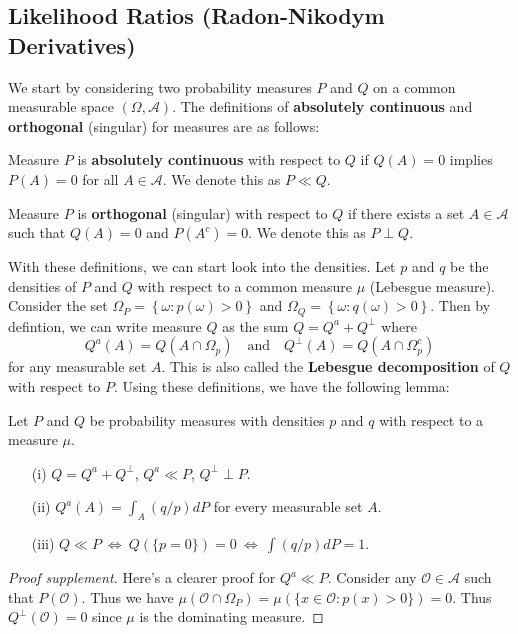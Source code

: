 \documentclass{article}
\begin{document}
\subsection{Likelihood Ratios (Radon-Nikodym Derivatives)}
We start by considering two probability measures $P$ and $Q$ on a common measurable space $(\Omega, \mathcal{A})$. The definitions of \textbf{absolutely continuous} and \textbf{orthogonal} (singular) for measures are as follows:
\begin{definition}
    Measure $P$ is \textbf{absolutely continuous} with respect to $Q$ if $Q(A) = 0$ implies $P(A) = 0$ for all $A \in \mathcal{A}$. We denote this as $P \ll Q$.
\end{definition}
\begin{definition}
    Measure $P$ is \textbf{orthogonal} (singular) with respect to $Q$ if there exists a set $A \in \mathcal{A}$ such that $Q(A) = 0$ and $P(A^c) = 0$. We denote this as $P \perp Q$.
\end{definition}
With these definitions, we can start look into the densities. Let $p$ and $q$ be the densities of $P$ and $Q$ with respect to a common measure $\mu$ (Lebesgue measure). Consider the set $\Omega_P = \left\{ \omega : p(\omega) > 0 \right\}$ and $\Omega_Q = \left\{ \omega : q(\omega) > 0 \right\}$. Then by defintion, we can write measure $Q$ as the sum $Q = Q^a + Q^\perp$ where
\begin{equation}
    Q^a(A) = Q(A\cap \Omega_p) \quad \text{and} \quad Q^\perp(A) = Q(A\cap \Omega_p^c)
\end{equation}
for any measurable set $A$. This is also called the \textbf{Lebesgue decomposition} of $Q$ with respect to $P$. Using these definitions, we have the following lemma:
\begin{lemma}
    Let \(P\) and \(Q\) be probability measures with densities \(p\) and \(q\) with respect to a measure \(\mu\).
\begin{enumerate}
    \item[(i)] \(Q = Q^a + Q^\perp\), \(Q^a \ll P\), \(Q^\perp \perp P\).
    \item[(ii)] \(Q^a(A) = \int_A \left(q/p\right) dP\) for every measurable set \(A\).
    \item[(iii)] \(Q \ll P \:\Longleftrightarrow\: Q(\{p = 0\}) = 0 \:\Longleftrightarrow\: \int \left(q/p\right) dP = 1\).
\end{enumerate}
\end{lemma}\label{lemma:contiguity}
\begin{proof}[Proof supplement]
    Here's a clearer proof for $Q^a \ll P$. Consider any $\mathcal{O} \in \mathcal{A}$ such that $P(\mathcal{O})$. Thus we have $\mu(\mathcal{O}\cap\Omega_P) = \mu(\{x \in \mathcal{O}: p(x) > 0\}) = 0$. Thus $Q^\perp(\mathcal{O}) = 0$ since $\mu$ is the dominating measure.
\end{proof}
\end{document}
